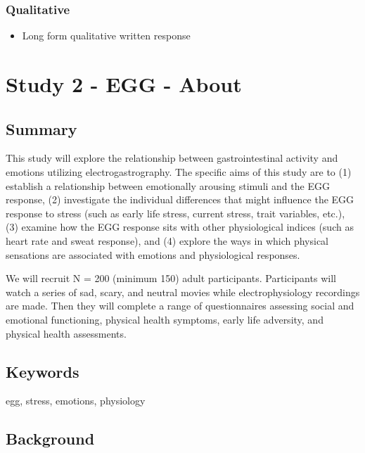 \documentclass[]{book}
\providecommand{\tightlist}{%
  \setlength{\itemsep}{0pt}\setlength{\parskip}{0pt}}
\begin{document}
\hypertarget{qualitative}{%
\subsection{Qualitative}\label{qualitative}}

\begin{itemize}
\tightlist
\item
  Long form qualitative written response
\end{itemize}

\hypertarget{study-2---egg---about}{%
\chapter{Study 2 - EGG - About}\label{study-2---egg---about}}

\hypertarget{summary-1}{%
\section{Summary}\label{summary-1}}

This study will explore the relationship between gastrointestinal activity and emotions utilizing electrogastrography. The specific aims of this study are to (1) establish a relationship between emotionally arousing stimuli and the EGG response, (2) investigate the individual differences that might influence the EGG response to stress (such as early life stress, current stress, trait variables, etc.), (3) examine how the EGG response sits with other physiological indices (such as heart rate and sweat response), and (4) explore the ways in which physical sensations are associated with emotions and physiological responses.

We will recruit N = 200 (minimum 150) adult participants. Participants will watch a series of sad, scary, and neutral movies while electrophysiology recordings are made. Then they will complete a range of questionnaires assessing social and emotional functioning, physical health symptoms, early life adversity, and physical health assessments.

\hypertarget{keywords-1}{%
\section{Keywords}\label{keywords-1}}

egg, stress, emotions, physiology

\hypertarget{background-1}{%
\section{Background}\label{background-1}}
\end{document}
